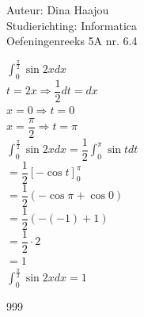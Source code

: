 \documentclass[a4paper]{article}
\begin{document}
\normalsize

\noindent \large Auteur: Dina Haajou \\
\noindent \large Studierichting: Informatica \\
\noindent \large Oefeningenreeks 5A nr. 6.4 \\

\medskip

\normalsize

$\displaystyle \int_0^{\tfrac{\pi}{2}} \sin 2x dx$ \\

$t = 2x \Rightarrow \dfrac{1}{2} dt = dx$ \\

$x = 0 \Rightarrow t = 0$ \\

$x = \dfrac{\pi}{2} \Rightarrow t = \pi$ \\

$\displaystyle \int_0^{\tfrac{\pi}{2}} \sin 2x dx = \dfrac{1}{2} \displaystyle \int_0^{\pi} \sin t dt$ \\

$= \dfrac{1}{2} \left[ -\cos t \right]_0^{\pi}$ \\

$= \dfrac{1}{2} \left( -\cos \pi + \cos 0 \right)$ \\

$= \dfrac{1}{2} \left( -(-1) + 1 \right)$ \\

$= \dfrac{1}{2} \cdot 2$ \\

$= 1$ \\

$\displaystyle \int_0^{\tfrac{\pi}{2}} \sin 2x dx = 1$ \\

\begin{thebibliography}{999}
\end{thebibliography}
\end{document}
